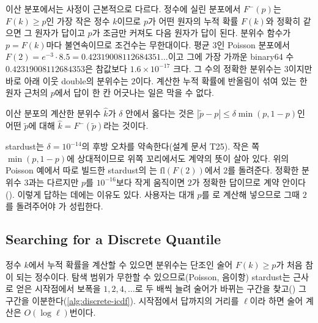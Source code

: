 이산 분포에서는 사정이 근본적으로 다르다. 정수에 실린 분포에서 $F^{-}(p)$는 $F(k)\ge p$인 가장 작은 정수 $k$이므로 $p$가 어떤 원자의 누적 확률 $F(k)$와 정확히 같으면 그 원자가 답이고 $p$가 조금만 커져도 다음 원자가 답이 된다. 분위수 함수가 $p=F(k)$마다 불연속이므로 조건수는 무한대이다. 평균 $3$인 Poisson 분포에서 $F(2)=e^{-3}\cdot8.5=0.42319008112684351\ldots$이고 그에 가장 가까운 binary64 수 $0.42319008112684353$은 참값보다 $1.6\times10^{-17}$ 크다. 그 수의 정확한 분위수는 $3$이지만 바로 아래 이웃 double의 분위수는 $2$이다. 계산한 누적 확률에 반올림이 섞여 있는 한 원자 근처의 $p$에서 답이 한 칸 어긋나는 일은 막을 수 없다.

\begin{definition}[후방 오차 계약]
\label{def:backward-quantile}
이산 분포의 계산한 분위수 $\hat k$가  $\delta$ 안에서 옳다는 것은 $|\tilde p-p|\le\delta\min(p,1-p)$인 어떤 $\tilde p$에 대해 $\hat k=F^{-}(\tilde p)$라는 것이다.
\end{definition}

stardust는 $\delta=10^{-14}$의 후방 오차를 약속한다(설계 문서 T25). 작은 쪽 $\min(p,1-p)$에 상대적이므로 위쪽 꼬리에서도 계약의 뜻이 살아 있다. 위의 Poisson 예에서 따로 빌드한 stardust의 는 $\mathrm{fl}(F(2))$에서 $2$를 돌려준다. 정확한 분위수 $3$과는 다르지만 $p$를 $10^{-16}$보다 작게 움직이면 $2$가 정확한 답이므로 계약 안이다(). 이렇게 답하는 데에는 이유도 있다. 사용자는 대개 $p$를 로 계산해 넣으므로 그때 $2$를 돌려주어야 가 성립한다.

\subsection{Searching for a Discrete Quantile}

정수 $k$에서 누적 확률을 계산할 수 있으면 분위수는 단조인 술어 $F(k)\ge p$가 처음 참이 되는 정수이다. 탐색 범위가 무한할 수 있으므로(Poisson, 음이항) stardust는 근사로 얻은 시작점에서 보폭을 $1,2,4,\dots$로 두 배씩 늘려 술어가 바뀌는 구간을 찾고() 그 구간을 이분한다(\cref{alg:discrete-icdf}). 시작점에서 답까지의 거리를 $\ell$이라 하면 술어 계산은 $O(\log\ell)$번이다.

